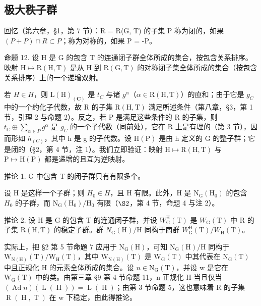 \subsection{极大秩子群}

回忆（第六章，§1，第 7 节）：R = R(G, T) 的子集 P 称为闭的，如果 \((P + P) \cap R \subset P\)；称为对称的，如果 P = -P。

命题 12. 设 H 是 G 的包含 T 的连通闭子群全体所成的集合，按包含关系排序。映射 \(\mathrm{H} \mapsto \mathrm{R}(\mathrm{H}, \mathrm{T})\) 是从 H 到 \(\mathrm{R}(\mathrm{G}, \mathrm{T})\) 的对称闭子集全体所成的集合（按包含关系排序）上的一个递增双射。

若 \(H \in H\)，则 \(\mathrm{L}(\mathrm{H})_{(\mathbf{C})}\) 是 \(t_{C}\) 与诸 \(g^{\alpha}\)（\(\alpha \in \mathrm{R}(\mathrm{H}, \mathrm{T})\)）的直和；由于它是 \(g_{C}\) 中的一个约化子代数，故 R 的子集 \(\mathrm{R}(\mathrm{H}, \mathrm{T})\) 满足所述条件（第八章，§3，第 1 节，引理 2 与命题 2）。反之，若 P 是满足这些条件的 R 的子集，则 \(t_{C} \oplus \sum_{\alpha \in P} g^{\alpha}\) 是 \(g_{C}\) 的一个子代数（同前处），它在 R 上是有理的（第 3 节），因而形如 \(h_{(C)}\)，其中 h 是 g 的子代数。设 \(\mathrm{H}(\mathrm{P})\) 是由 h 定义的 G 的整子群；它是闭的（§2，第 4 节，注 1）。我们立即验证：映射 \(\mathrm{H} \mapsto \mathrm{R}(\mathrm{H}, \mathrm{T})\) 与 \(\mathrm{P} \mapsto \mathrm{H}(\mathrm{P})\) 都是递增的且互为逆映射。

推论 1. G 中包含 T 的闭子群只有有限多个。

设 H 是这样一个子群；则 \(H_{0} \in H\)，且 H 有限。此外，H 是 \(\mathrm{N}_{\mathrm{G}}(\mathrm{H}_{0})\) 的包含 \(H_{0}\) 的子群，而 \(\mathrm{N}_{\mathrm{G}}(\mathrm{H}_{0})/\mathrm{H}_{0}\) 有限（\(\S2\)，第 4 节，命题 4 与注 2）。

推论 2. 设 H 是 G 的包含 T 的连通闭子群，并设 \(W_{\mathrm{G}}^{\mathrm{H}}(\mathrm{T})\) 是 \(W_{\mathrm{G}}(\mathrm{T})\) 中 R 的子集 \(\mathrm{R}(\mathrm{H},\mathrm{T})\) 的稳定子群。群 \(N_{\mathrm{G}}(\mathrm{H})/\mathrm{H}\) 同构于商群 \(W_{\mathrm{G}}^{\mathrm{H}}(\mathrm{T})/W_{\mathrm{H}}(\mathrm{T})\)。

实际上，把 §2 第 5 节命题 7 应用于 \(\mathrm{N}_{\mathrm{G}}(\mathrm{H})\)，可知 \(\mathrm{N}_{\mathrm{G}}(\mathrm{H})/\mathrm{H}\) 同构于 \(\mathrm{W}_{\mathrm{N}(\mathrm{H})}(\mathrm{T})/\mathrm{W}_{\mathrm{H}}(\mathrm{T})\)，其中 \(\mathrm{W}_{\mathrm{N}(\mathrm{H})}(\mathrm{T})\) 是 \(\mathrm{W}_{\mathrm{G}}(\mathrm{T})\) 中其代表在 \(\mathrm{N}_{\mathrm{G}}(\mathrm{T})\) 中且正规化 H 的元素全体所成的集合。设 \(n \in \mathrm{N}_{\mathrm{G}}(\mathrm{T})\)，并设 w 是它在 \(\mathrm{W}_{\mathrm{G}}(\mathrm{T})\) 中的类。由第三章 §9 第 4 节命题 11，n 正规化 H 当且仅当 \((\operatorname{Ad} n)(\operatorname{L}(\operatorname{H})) = \operatorname{L}(\operatorname{H})\)；由第 3 节命题 5，这也意味着 R 的子集 \(\operatorname{R}(\operatorname{H}, \operatorname{T})\) 在 w 下稳定，由此得推论。

